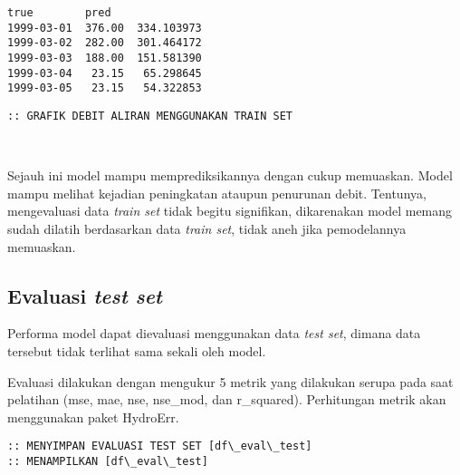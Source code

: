 \documentclass[11pt]{article}
\makeatletter
\newcommand{\boxspacing}{\kern\kvtcb@left@rule\kern\kvtcb@boxsep}
\newcommand{\prompt}[4]{
        \ttfamily\llap{{\color{#2}[#3]:\hspace{3pt}#4}}\vspace{-\baselineskip}
    }
\makeatother
\begin{document}
            \begin{tcolorbox}[breakable, size=fbox, boxrule=.5pt, pad at break*=1mm, opacityfill=0]
\prompt{Out}{outcolor}{0}{\boxspacing}
\begin{Verbatim}[commandchars=\\\{\}]
              true        pred
1999-03-01  376.00  334.103973
1999-03-02  282.00  301.464172
1999-03-03  188.00  151.581390
1999-03-04   23.15   65.298645
1999-03-05   23.15   54.322853
\end{Verbatim}
\end{tcolorbox}
        
    \begin{Verbatim}[commandchars=\\\{\}]
:: GRAFIK DEBIT ALIRAN MENGGUNAKAN TRAIN SET
    \end{Verbatim}

    \begin{center}
    \end{center}
    { \hspace*{\fill} \\}
    
    Sejauh ini model mampu memprediksikannya dengan cukup memuaskan. Model
mampu melihat kejadian peningkatan ataupun penurunan debit. Tentunya,
mengevaluasi data \emph{train set} tidak begitu signifikan, dikarenakan
model memang sudah dilatih berdasarkan data \emph{train set}, tidak aneh
jika pemodelannya memuaskan.

    \hypertarget{evaluasi-test-set}{%
\subsection{\texorpdfstring{Evaluasi \emph{test
set}}{Evaluasi test set}}\label{evaluasi-test-set}}

Performa model dapat dievaluasi menggunakan data \emph{test set}, dimana
data tersebut tidak terlihat sama sekali oleh model.

Evaluasi dilakukan dengan mengukur 5 metrik yang dilakukan serupa pada
saat pelatihan (mse, mae, nse, nse\_mod, dan r\_squared). Perhitungan
metrik akan menggunakan paket HydroErr.

    \begin{Verbatim}[commandchars=\\\{\}]
:: MENYIMPAN EVALUASI TEST SET [df\_eval\_test]
:: MENAMPILKAN [df\_eval\_test]
    \end{Verbatim}
\end{document}
